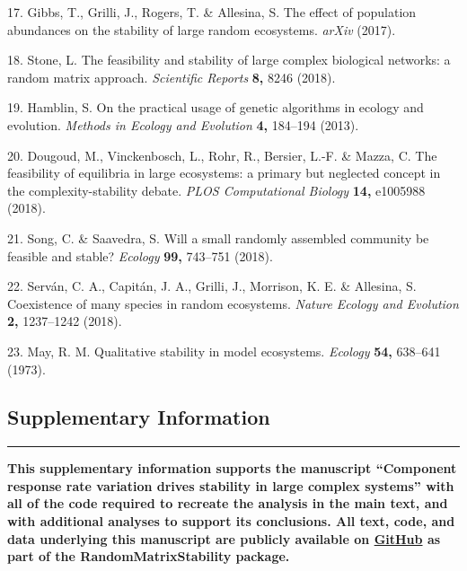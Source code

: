 \documentclass[]{article}
\begin{document}
\hypertarget{ref-Gibbs2017}{}
17. Gibbs, T., Grilli, J., Rogers, T. \& Allesina, S. The effect of
population abundances on the stability of large random ecosystems.
\emph{arXiv} (2017).

\hypertarget{ref-Stone2017}{}
18. Stone, L. The feasibility and stability of large complex biological
networks: a random matrix approach. \emph{Scientific Reports}
\textbf{8,} 8246 (2018).

\hypertarget{ref-Hamblin2013}{}
19. Hamblin, S. On the practical usage of genetic algorithms in ecology
and evolution. \emph{Methods in Ecology and Evolution} \textbf{4,}
184--194 (2013).

\hypertarget{ref-Dougoud2018}{}
20. Dougoud, M., Vinckenbosch, L., Rohr, R., Bersier, L.-F. \& Mazza, C.
The feasibility of equilibria in large ecosystems: a primary but
neglected concept in the complexity-stability debate. \emph{PLOS
Computational Biology} \textbf{14,} e1005988 (2018).

\hypertarget{ref-Song2018}{}
21. Song, C. \& Saavedra, S. Will a small randomly assembled community
be feasible and stable? \emph{Ecology} \textbf{99,} 743--751 (2018).

\hypertarget{ref-Servan2018}{}
22. Serván, C. A., Capitán, J. A., Grilli, J., Morrison, K. E. \&
Allesina, S. Coexistence of many species in random ecosystems.
\emph{Nature Ecology and Evolution} \textbf{2,} 1237--1242 (2018).

\hypertarget{ref-May1973}{}
23. May, R. M. Qualitative stability in model ecosystems. \emph{Ecology}
\textbf{54,} 638--641 (1973).

\clearpage



\begin{center}
\hypertarget{SIstart}{\section{Supplementary Information}\label{SIstart}}
\end{center}

\begin{center}\rule{0.5\linewidth}{\linethickness}\end{center}

\textbf{This supplementary information supports the manuscript
``Component response rate variation drives stability in large complex
systems'' with all of the code required to recreate the analysis in the
main text, and with additional analyses to support its conclusions. All
text, code, and data underlying this manuscript are publicly available
on \href{https://github.com/bradduthie/RandomMatrixStability}{GitHub}
as part of the RandomMatrixStability package.}
\end{document}
